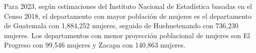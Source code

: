 Para 2023, según estimaciones del Instituto Nacional de Estadística basadas en el Censo 2018, el departamento con mayor población de mujeres es el departamento de Guatemala con 1,884,252 mujeres, seguido de Huehuetenando con 736,230 mujeres. Los departamentos con menor proyección poblacional de mujeres son El Progreso con 99,546 mujeres y Zacapa con 140,863 mujeres. 
